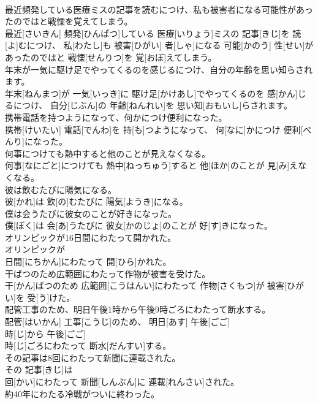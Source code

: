 \documentclass[8pt]{extreport}
\begin{document}
\begin{CJK}{UTF8}{min}
\\	最近頻発している医療ミスの記事を読むにつけ、私も被害者になる可能性があったのではと戦慄を覚えてしまう。	
\\	最近[さいきん] 頻発[ひんぱつ]している 医療[いりょう]ミスの 記事[きじ]を 読[よ]むにつけ、 私[わたし]も 被害[ひがい] 者[しゃ]になる 可能[かのう] 性[せい]があったのではと 戦慄[せんりつ]を 覚[おぼ]えてしまう。
\\	年末が一気に駆け足でやってくるのを感じるにつけ、自分の年齢を思い知らされます。	
\\	年末[ねんまつ]が 一気[いっき]に 駆け足[かけあし]でやってくるのを 感[かん]じるにつけ、 自分[じぶん]の 年齢[ねんれい]を 思い知[おもいし]らされます。
\\	携帯電話を持つようになって、何かにつけ便利になった。	
\\	携帯[けいたい] 電話[でんわ]を 持[も]つようになって、 何[なに]かにつけ 便利[べんり]になった。
\\	何事につけても熱中すると他のことが見えなくなる。	
\\	何事[なにごと]につけても 熱中[ねっちゅう]すると 他[ほか]のことが 見[み]えなくなる。
\\	彼は飲むたびに陽気になる。	
\\	彼[かれ]は 飲[の]むたびに 陽気[ようき]になる。
\\	僕は会うたびに彼女のことが好きになった。	
\\	僕[ぼく]は 会[あ]うたびに 彼女[かのじょ]のことが 好[す]きになった。
\\	オリンピックが16日間にわたって開かれた。	
\\	オリンピックが 
\\	日間[にちかん]にわたって 開[ひら]かれた。
\\	干ばつのため広範囲にわたって作物が被害を受けた。	
\\	干[かん]ばつのため 広範囲[こうはんい]にわたって 作物[さくもつ]が 被害[ひがい]を 受[う]けた。
\\	配管工事のため、明日午後1時から午後9時ごろにわたって断水する。	
\\	配管[はいかん] 工事[こうじ]のため、 明日[あす] 午後[ごご] 
\\	時[じ]から 午後[ごご] 
\\	時[じ]ごろにわたって 断水[だんすい]する。
\\	その記事は8回にわたって新聞に連載された。	
\\	その 記事[きじ]は 
\\	回[かい]にわたって 新聞[しんぶん]に 連載[れんさい]された。
\\	約40年にわたる冷戦がついに終わった。	

\end{CJK}
\end{document}

